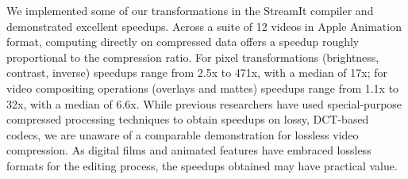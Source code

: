 We implemented some of our transformations in the StreamIt compiler
and demonstrated excellent speedups.  Across a suite of 12 videos in
Apple Animation format, computing directly on compressed data offers a
speedup roughly proportional to the compression ratio.  For pixel
transformations (brightness, contrast, inverse) speedups range from
2.5x to 471x, with a median of 17x; for video compositing operations
(overlays and mattes) speedups range from 1.1x to 32x, with a median
of 6.6x.  While previous researchers have used special-purpose
compressed processing techniques to obtain speedups on lossy,
DCT-based codecs, we are unaware of a comparable demonstration for
lossless video compression.  As digital films and animated features
have embraced lossless formats for the editing process, the speedups
obtained may have practical value.
\vspace{-1pt}
